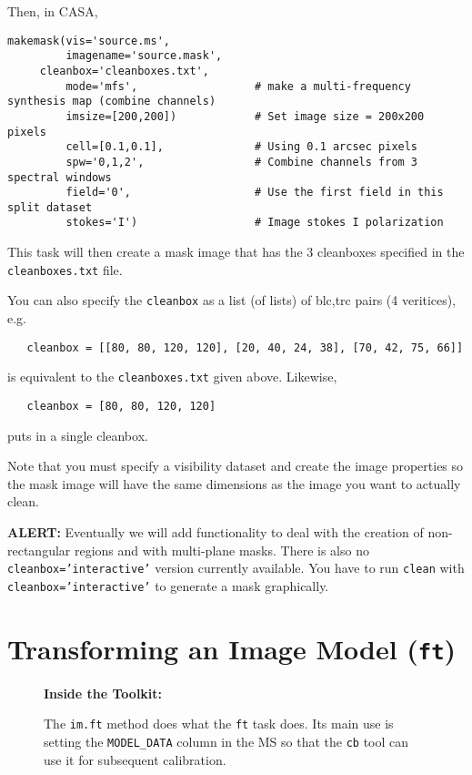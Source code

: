 Then, in CASA,
\small
\begin{verbatim}
makemask(vis='source.ms',
         imagename='source.mask',
	 cleanbox='cleanboxes.txt',
         mode='mfs',                  # make a multi-frequency synthesis map (combine channels)
         imsize=[200,200])            # Set image size = 200x200 pixels
         cell=[0.1,0.1],              # Using 0.1 arcsec pixels
         spw='0,1,2',                 # Combine channels from 3 spectral windows
         field='0',                   # Use the first field in this split dataset
         stokes='I')                  # Image stokes I polarization
\end{verbatim}
\normalsize
This task will then create a mask image that has the 3 cleanboxes
specified in the {\tt cleanboxes.txt} file.  

You can also specify the {\tt cleanbox} as a list (of lists) of
blc,trc pairs (4 veritices), e.g.
\small
\begin{verbatim}
   cleanbox = [[80, 80, 120, 120], [20, 40, 24, 38], [70, 42, 75, 66]]
\end{verbatim}
\normalsize
is equivalent to the {\tt cleanboxes.txt} given above.  Likewise,
\small
\begin{verbatim}
   cleanbox = [80, 80, 120, 120]
\end{verbatim}
\normalsize
puts in a single cleanbox.

Note that you must specify a visibility dataset and create the image
properties so the mask image will have the same dimensions as the
image you want to actually clean.  

{\bf ALERT:} Eventually we will add functionality to deal with the creation of
non-rectangular regions and with multi-plane masks.  There is also no
{\tt cleanbox='interactive'} version currently available.  You have to run
{\tt clean} with {\tt cleanbox='interactive'} to generate a mask graphically.

\section{Transforming an Image Model ({\tt ft})}
\label{section:im.ft}

\begin{wrapfigure}{r}{2.5in}
  \begin{boxedminipage}{2.5in}
     \centerline{\bf Inside the Toolkit:}
     The {\tt im.ft} method does what the {\tt ft} task does.
     Its main use is setting the {\tt MODEL\_DATA} column in the
     MS so that the {\tt cb} tool can use it for subsequent
     calibration.
  \end{boxedminipage}
\end{wrapfigure}

